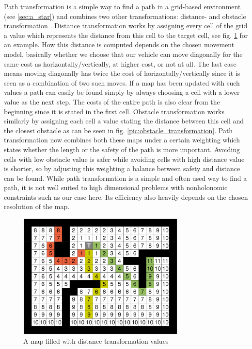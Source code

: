 Path transformation is a simple way to find a path in a grid-based environment (see \ref{sec:a_star}) and combines two other transformations: distance- and obstacle transformation \cite{35}. Distance transformation works by assigning every cell of the grid a value which represents the distance from this cell to the target cell, see fig. \ref{pic:distance_transformation} for an example. How this distance is computed depends on the chosen movement model, basically whether we choose that our vehicle can move diagonally for the same cost as horizontally/vertically, at higher cost, or not at all. The last case means moving diagonally has twice the cost of horizontally/vertically since it is seen as a combination of two such moves. If a map has been updated with such values a path can easily be found simply by always choosing a cell with a lower value as the next step. The costs of the entire path is also clear from the beginning since it is stated in the first cell. Obstacle transformation works similarly by assigning each cell a value stating the distance between this cell and the closest obstacle as can be seen in fig. \ref{pic:obstacle_transformation}. Path transformation now combines both these maps under a certain weighting which states whether the length or the safety of the path is more important. Avoiding cells with low obstacle value is safer while avoiding cells with high distance value is shorter, so by adjusting this weighting a balance between safety and distance can be found. 
While path transformation is a simple and often used way to find a path, it is not well suited to high dimensional problems with nonholonomic constraints such as our case here. Its efficiency also heavily depends on the chosen resolution of the map.

\begin{figure}[b]
\centering
\includegraphics[width=0.75\textwidth]{./Chapters/Figures/distance_transformation.png}
\caption{A map filled with distance transformation values\label{pic:distance_transformation}}
\end{figure}

